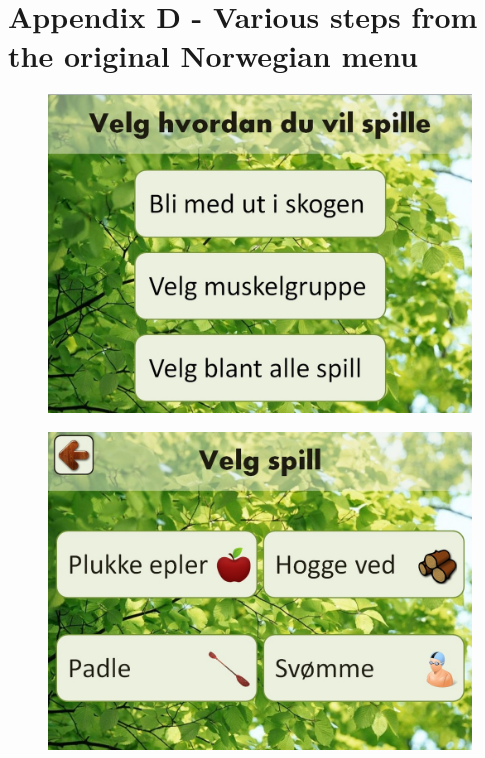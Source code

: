 \newpage
\section*{Appendix D - Various steps from the original Norwegian menu}
\label{app:menu}

\begin{figure} [H]
\centering
\includegraphics[scale=0.45]{menuStart.jpg}
\label{fig:menuStartNorsk}
\end{figure} 

\begin{figure} [H]
\centering
\includegraphics[scale=0.4]{VelgSpill.jpg}
\label{velgSpillNorsk}
\end{figure}

